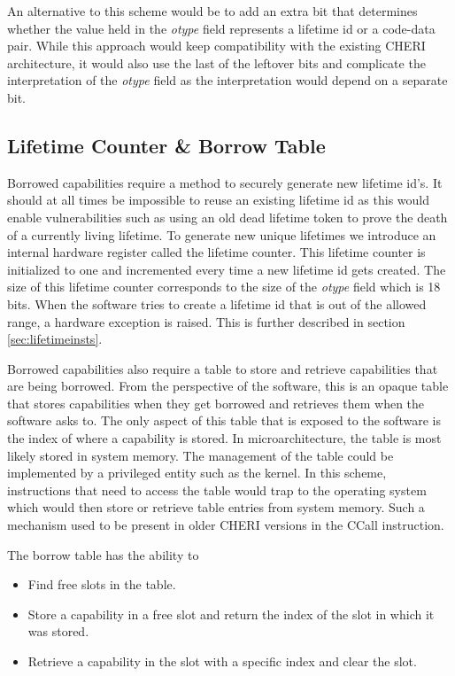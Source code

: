 An alternative to this scheme would be to add an extra bit that determines whether the value held in the \textit{otype} field represents a lifetime id or a code-data pair. While this approach would keep compatibility with the existing CHERI architecture, it would also use the last of the leftover bits and complicate the interpretation of the \textit{otype} field as the interpretation would depend on a separate bit.

\subsection{Lifetime Counter \& Borrow Table}
\label{sec:lcbt}
Borrowed capabilities require a method to securely generate new lifetime id's. It should at all times be impossible to reuse an existing lifetime id as this would enable vulnerabilities such as using an old dead lifetime token to prove the death of a currently living lifetime. To generate new unique lifetimes we introduce an internal hardware register called the lifetime counter. This lifetime counter is initialized to one and incremented every time a new lifetime id gets created. The size of this lifetime counter corresponds to the size of the \textit{otype} field which is 18 bits. When the software tries to create a lifetime id that is out of the allowed range, a hardware exception is raised. This is further described in section \ref{sec:lifetimeinsts}.

Borrowed capabilities also require a table to store and retrieve capabilities that are being borrowed. From the perspective of the software, this is an opaque table that stores capabilities when they get borrowed and retrieves them when the software asks to. The only aspect of this table that is exposed to the software is the index of where a capability is stored. In microarchitecture, the table is most likely stored in system memory. The management of the table could be implemented by a privileged entity such as the kernel. In this scheme, instructions that need to access the table would trap to the operating system which would then store or retrieve table entries from system memory. Such a mechanism used to be present in older CHERI versions in the CCall instruction. %

The borrow table has the ability to
\begin{itemize}
\item Find free slots in the table.
\item Store a capability in a free slot and return the index of the slot in which it was stored.
\item Retrieve a capability in the slot with a specific index and clear the slot.
\end{itemize}

